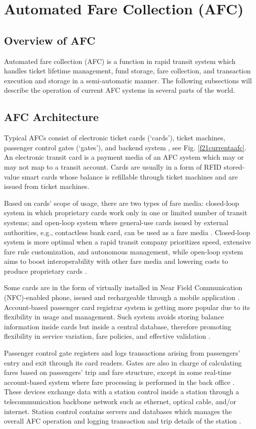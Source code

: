 \documentclass[a4paper,12pt,oneside, utf8x]{report}
\begin{document}
\section{Automated Fare Collection (AFC)}
\subsection{Overview of AFC}
Automated fare collection (AFC) is a function in rapid transit system which handles ticket lifetime management, fund storage, fare collection, and transaction execution and storage in a semi-automatic manner. The following subsections will describe the operation of current AFC systems in several parts of the world.
\subsection{AFC Architecture}
Typical AFCs consist of electronic ticket cards (‘cards’), ticket machines, passenger control gates (‘gates’), and backend system \cite{a11}, see Fig. \ref{f21currentaafc}. An electronic transit card is a payment media of an AFC system which may or may not map to a transit account. Cards are usually in a form of RFID stored-value smart cards whose balance is refillable through ticket machines and are issued from ticket machines.

Based on cards’ scope of usage, there are two types of fare media: closed-loop system in which proprietary cards work only in one or limited number of transit systems; and open-loop system where general-use cards issued by external authorities, e.g., contactless bank card, can be used as a fare media \cite{a12,a13}. Closed-loop system is more optimal when a rapid transit company prioritizes speed, extensive fare rule customization, and autonomous management, while open-loop system aims to boost interoperability with other fare media and lowering costs to produce proprietary cards \cite{a14}.

Some cards are in the form of virtually installed in Near Field Communication (NFC)-enabled phone, issued and rechargeable through a mobile application \cite{a13,a15}. Account-based passenger card registrar system is getting more popular due to its flexibility in usage and management. Such system avoids storing balance information inside cards but inside a central database, therefore promoting flexibility in service variation, fare policies, and effective validation \cite{a13}.

Passenger control gate registers and logs transactions arising from passengers’ entry and exit through its card readers. Gates are also in charge of calculating fares based on passengers’ trip and fare structure, except in some real-time account-based system where fare processing is performed in the back office \cite{a15}. These devices exchange data with a station control inside a station through a telecommunication backbone network such as ethernet, optical cable, and/or internet. Station control contains servers and databases which manages the overall AFC operation and logging transaction and trip details of the station \cite{a4,a16}. 
\end{document}
